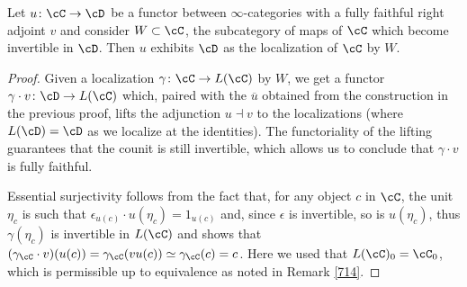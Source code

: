 \begin{prop}

  Let $u\colon\cC\rightarrow\cD$ be a functor between $\infty$-categories with a
  fully faithful right adjoint $v$ and consider $W\subset\cC$, the
  subcategory of maps of $\cC$ which become invertible in $\cD$. Then $u$
  exhibits $\cD$ as the localization of $\cC$ by $W$.
\end{prop}
\begin{proof}
  Given a localization $\gamma\colon\cC\rightarrow L(\cC)$ by $W$, we get a
  functor $\gamma\cdot v\colon\cD\rightarrow L(\cC)$ which, paired with the
  $\overline{u}$ obtained from the construction in the previous proof, lifts the
  adjunction $u\dashv v$ to the localizations (where $L(\cD)=\cD$ as we
  localize at the identities). The functoriality of the lifting guarantees that
  the counit is still invertible, which allows us to conclude that $\gamma\cdot
  v$ is fully faithful.

  Essential surjectivity
  follows from the fact that, for any object $c$ in $\cC$, the unit $\eta_c$ is
  such that $\epsilon_{u(c)}\cdot u(\eta_c)=1_{u(c)}$ and, since $\epsilon$ is
  invertible, so is $u(\eta_c)$, thus $\gamma(\eta_c)$ is invertible in $L(\cC)$
  and shows that
  $(\gamma_{\cC}\cdot v)(u(c))=\gamma_{\cC}(vu(c))\simeq\gamma_\cC(c)=c$.
  Here we used that $L(\cC)_0=\cC_0$, which is permissible up to
  equivalence as noted in Remark \ref{714}.
\end{proof}







